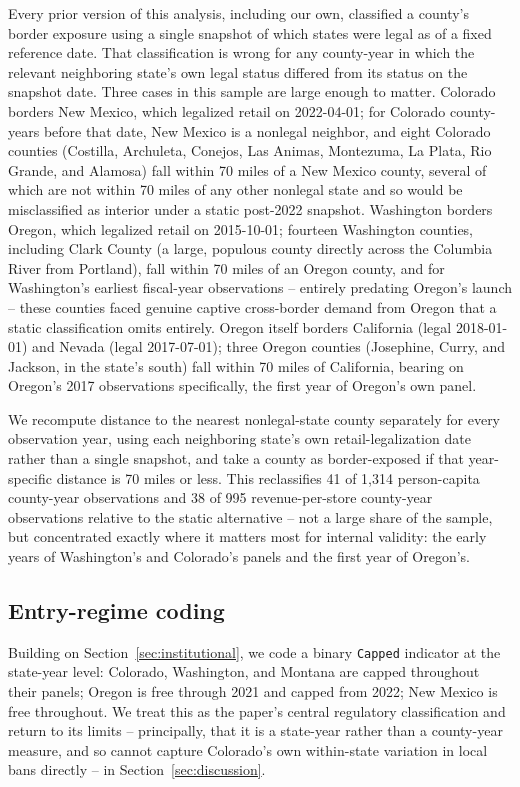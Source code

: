\documentclass[12pt]{article}
\begin{document}
Every prior version of this analysis, including our own, classified a county's border exposure using a single
snapshot of which states were legal as of a fixed reference date. That classification is wrong for any
county-year in which the relevant neighboring state's own legal status differed from its status on the
snapshot date. Three cases in this sample are large enough to matter. Colorado borders New Mexico, which
legalized retail on 2022-04-01; for Colorado county-years before that date, New Mexico is a nonlegal neighbor,
and eight Colorado counties (Costilla, Archuleta, Conejos, Las Animas, Montezuma, La Plata, Rio Grande, and
Alamosa) fall within 70 miles of a New Mexico county, several of which are not within 70 miles of any other
nonlegal state and so would be misclassified as interior under a static post-2022 snapshot. Washington borders
Oregon, which legalized retail on 2015-10-01; fourteen Washington counties, including Clark County (a large,
populous county directly across the Columbia River from Portland), fall within 70 miles of an Oregon county,
and for Washington's earliest fiscal-year observations -- entirely predating Oregon's launch -- these counties
faced genuine captive cross-border demand from Oregon that a static classification omits entirely. Oregon
itself borders California (legal 2018-01-01) and Nevada (legal 2017-07-01); three Oregon counties (Josephine,
Curry, and Jackson, in the state's south) fall within 70 miles of California, bearing on Oregon's 2017
observations specifically, the first year of Oregon's own panel.

We recompute distance to the nearest nonlegal-state county separately for every observation year, using each
neighboring state's own retail-legalization date rather than a single snapshot, and take a county as
border-exposed if that year-specific distance is 70 miles or less. This reclassifies 41 of 1,314 person-capita
county-year observations and 38 of 995 revenue-per-store county-year observations relative to the static
alternative -- not a large share of the sample, but concentrated exactly where it matters most for internal
validity: the early years of Washington's and Colorado's panels and the first year of Oregon's.

\subsection{Entry-regime coding}

Building on Section~\ref{sec:institutional}, we code a binary \texttt{Capped} indicator at the state-year
level: Colorado, Washington, and Montana are capped throughout their panels; Oregon is free through 2021 and
capped from 2022; New Mexico is free throughout. We treat this as the paper's central regulatory
classification and return to its limits -- principally, that it is a state-year rather than a county-year
measure, and so cannot capture Colorado's own within-state variation in local bans directly -- in
Section~\ref{sec:discussion}.
\end{document}

